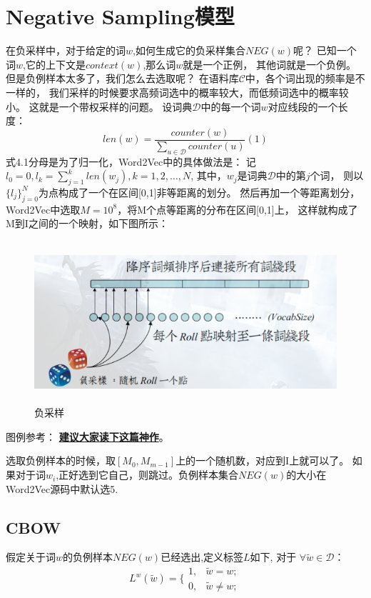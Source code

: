 \chapter{Negative Sampling模型}

在负采样中，对于给定的词$w$,如何生成它的负采样集合$NEG(w)$呢？
已知一个词$w$,它的上下文是$context(w)$,那么词$w$就是一个正例，
其他词就是一个负例。但是负例样本太多了，我们怎么去选取呢？
在语料库$\mathcal{C}$中，各个词出现的频率是不一样的，
我们采样的时候要求高频词选中的概率较大，而低频词选中的概率较小。
这就是一个带权采样的问题。
设词典$\mathcal{D}$中的每一个词$w$对应线段的一个长度：
\begin{equation}
    len(w) = \frac{counter(w)}{\sum_{u \in \mathcal{D}}counter(u)} (1)
\end{equation}
式4.1分母是为了归一化，Word2Vec中的具体做法是：
记$l_0 = 0, l_k = \sum_{j=1}^{k} len(w_j), k=1,2, \dots, N$,
其中，$w_j$是词典$\mathcal{D}$中的第$j$个词，
则以$\{l_j\}_{j=0}^{N}$为点构成了一个在区间[0,1]非等距离的划分。
然后再加一个等距离划分，Word2Vec中选取$M=10^8$，将M个点等距离的分布在区间[0,1]上，
这样就构成了M到I之间的一个映射，如下图所示：
\begin{figure}[h]
    \begin{center}
        \includegraphics[width=12cm, height=6cm]{4_1}
        \caption{负采样}
    \end{center}
\end{figure}

图例参考：
\href{http://www.cnblogs.com/neopenx/p/4571996.html}{\textbf{建议大家读下这篇神作}}。

选取负例样本的时候，取$[M_0, M_{m-1}]$上的一个随机数，对应到I上就可以了。
如果对于词$w_i$,正好选到它自己，则跳过。负例样本集合$NEG(w)$的大小在Word2Vec源码中默认选5.

\section{CBOW}
假定关于词$w$的负例样本$NEG(w)$已经选出,定义标签$L$如下,
对于 $\forall \widetilde{w} \in \mathcal{D}$：
\begin{equation}
    L^w(\widetilde{w}) = \Bigg\{ \begin{array} {ll}
        1,  & \widetilde{w} = w ;\\
        0, & \widetilde{w} \ne w;
        \end{array}
\end{equation}

